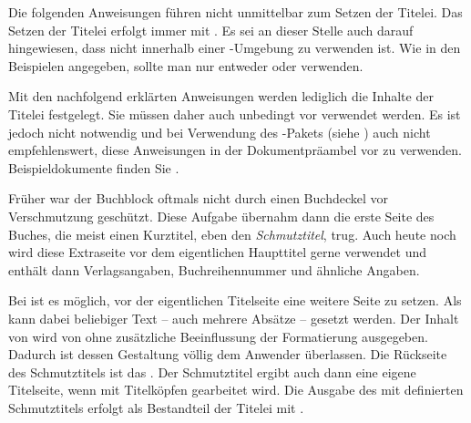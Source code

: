 Die folgenden Anweisungen führen nicht unmittelbar zum Setzen der Titelei. Das
Setzen der Titelei erfolgt immer mit . Es sei an dieser
Stelle auch darauf hingewiesen, dass  nicht innerhalb einer
-Umgebung zu verwenden
ist. Wie in den Beispielen angegeben, sollte man nur
entweder  oder 
verwenden.

Mit den nachfolgend erklärten Anweisungen werden lediglich die Inhalte der
Titelei festgelegt. Sie müssen daher auch unbedingt vor 
verwendet werden. Es ist jedoch nicht notwendig und bei Verwendung des
-Pakets (siehe \cite{package:babel}) auch
nicht empfehlenswert, diese Anweisungen in der Dokumentpräambel vor
 zu verwenden.  Beispieldokumente finden Sie
.


\begin{Declaration}
\end{Declaration}%
\begin{Explain}%
  Früher war der Buchblock oftmals nicht durch einen Buchdeckel vor
  Verschmutzung geschützt. Diese Aufgabe übernahm dann die erste Seite des
  Buches, die meist einen Kurztitel, eben den \emph{Schmutztitel}, trug. Auch
  heute noch wird diese Extraseite vor dem eigentlichen Haupttitel gerne
  verwendet und enthält dann Verlagsangaben, Buchreihennummer und ähnliche
  Angaben.
\end{Explain}
Bei {\KOMAScript} ist es möglich, vor der eigentlichen Titelseite eine weitere
Seite zu setzen. Als  kann dabei
beliebiger Text -- auch mehrere Absätze -- gesetzt werden. Der Inhalt von
 wird von {\KOMAScript} ohne zusätzliche Beeinflussung der
Formatierung ausgegeben. Dadurch ist dessen Gestaltung völlig dem Anwender
überlassen. Die Rückseite%
des Schmutztitels ist das . Der Schmutztitel
ergibt auch dann eine eigene Titelseite, wenn mit Titelköpfen gearbeitet
wird. Die Ausgabe des mit  definierten Schmutztitels erfolgt
als Bestandteil der Titelei mit .

